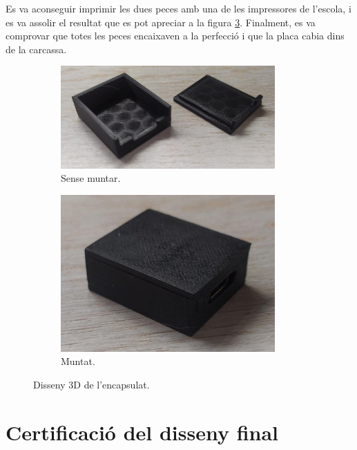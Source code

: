 Es va aconseguir imprimir les dues peces amb una de les impressores de
l'escola, i es va assolir el resultat que es pot apreciar a la figura
\ref{fig:3d_real}. Finalment, es va comprovar que totes les peces encaixaven a la
perfecció i que la placa cabia dins de la carcassa.

\begin{figure}[ht]
    \centering
    \begin{subfigure}{0.50\textwidth}
        \centering
        \includegraphics[width=0.9\textwidth]{images/device/3d_unmounted.jpeg}
        \caption{Sense muntar.}
        \label{fig:3d_real_unmounted}
    \end{subfigure}
    \begin{subfigure}{0.4\textwidth}
        \centering
        \includegraphics[width=0.9\textwidth]{images/device/3d_mounted.jpeg}
        \caption{Muntat.}
        \label{fig:3d_real_mounted}
    \end{subfigure}
    \caption{Disseny 3D de l'encapsulat.}
    \label{fig:3d_real}
\end{figure}

\section{Certificació del disseny final}

